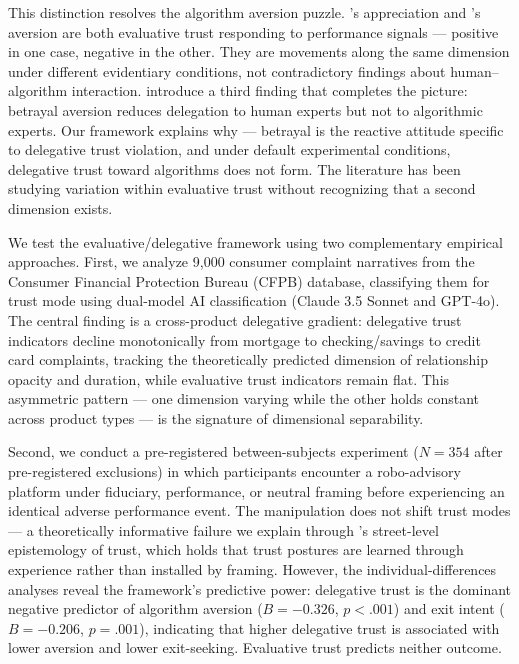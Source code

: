 This distinction resolves the algorithm aversion puzzle. \citeauthor{LoggMinsonMoore2019}'s appreciation and \citeauthor{DietvorstSimmonsMassey2015}'s aversion are both evaluative trust responding to performance signals --- positive in one case, negative in the other. They are movements along the same dimension under different evidentiary conditions, not contradictory findings about human--algorithm interaction. \citet{kormylo2026} introduce a third finding that completes the picture: betrayal aversion reduces delegation to human experts but not to algorithmic experts. Our framework explains why --- betrayal is the reactive attitude specific to delegative trust violation, and under default experimental conditions, delegative trust toward algorithms does not form. The literature has been studying variation within evaluative trust without recognizing that a second dimension exists.

We test the evaluative/delegative framework using two complementary empirical approaches. First, we analyze 9,000 consumer complaint narratives from the Consumer Financial Protection Bureau (CFPB) database, classifying them for trust mode using dual-model AI classification (Claude 3.5 Sonnet and GPT-4o). The central finding is a cross-product delegative gradient: delegative trust indicators decline monotonically from mortgage to checking/savings to credit card complaints, tracking the theoretically predicted dimension of relationship opacity and duration, while evaluative trust indicators remain flat. This asymmetric pattern --- one dimension varying while the other holds constant across product types --- is the signature of dimensional separability.

Second, we conduct a pre-registered between-subjects experiment ($N = 354$ after pre-registered exclusions) in which participants encounter a robo-advisory platform under fiduciary, performance, or neutral framing before experiencing an identical adverse performance event. The manipulation does not shift trust modes --- a theoretically informative failure we explain through \citeauthor{hardin1993street}'s \citeyearpar{hardin1993street} street-level epistemology of trust, which holds that trust postures are learned through experience rather than installed by framing. However, the individual-differences analyses reveal the framework's predictive power: delegative trust is the dominant negative predictor of algorithm aversion ($B = -0.326$, $p < .001$) and exit intent ($B = -0.206$, $p = .001$), indicating that higher delegative trust is associated with lower aversion and lower exit-seeking. Evaluative trust predicts neither outcome.

